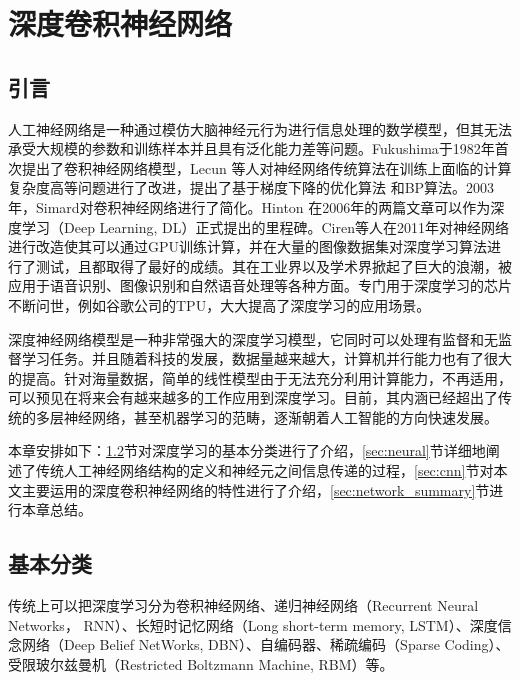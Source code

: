 
\chapter{深度卷积神经网络}
\label{sec:network}
\section{引言}

人工神经网络是一种通过模仿大脑神经元行为进行信息处理的数学模型，但其无法承受大规模的参数和训练样本并且具有泛化能力差等问题。Fukushima于1982年首次提出了卷积神经网络模型，Lecun 等人对神经网络传统算法在训练上面临的计算复杂度高等问题进行了改进，提出了基于梯度下降的优化算法 和BP算法。2003年，Simard对卷积神经网络进行了简化。Hinton 在2006年的两篇文章可以作为深度学习（Deep Learning, DL）正式提出的里程碑。Ciren等人在2011年对神经网络进行改造使其可以通过GPU训练计算，并在大量的图像数据集对深度学习算法进行了测试，且都取得了最好的成绩。其在工业界以及学术界掀起了巨大的浪潮，被应用于语音识别、图像识别和自然语音处理等各种方面。专门用于深度学习的芯片不断问世，例如谷歌公司的TPU，大大提高了深度学习的应用场景。

深度神经网络模型是一种非常强大的深度学习模型，它同时可以处理有监督和无监督学习任务。并且随着科技的发展，数据量越来越大，计算机并行能力也有了很大的提高。针对海量数据，简单的线性模型由于无法充分利用计算能力，不再适用，可以预见在将来会有越来越多的工作应用到深度学习。目前，其内涵已经超出了传统的多层神经网络，甚至机器学习的范畴，逐渐朝着人工智能的方向快速发展。

本章安排如下：\ref{sec:network_classification}节对深度学习的基本分类进行了介绍，\ref{sec:neural}节详细地阐述了传统人工神经网络结构的定义和神经元之间信息传递的过程，\ref{sec:cnn}节对本文主要运用的深度卷积神经网络的特性进行了介绍，\ref{sec:network_summary}节进行本章总结。

\section{基本分类}
\label{sec:network_classification}
传统上可以把深度学习分为卷积神经网络、递归神经网络（Recurrent Neural Networks， RNN）、长短时记忆网络（Long short-term memory, LSTM）、深度信念网络（Deep Belief NetWorks, DBN）、自编码器、稀疏编码（Sparse Coding）、受限玻尔兹曼机（Restricted Boltzmann Machine, RBM）等。

